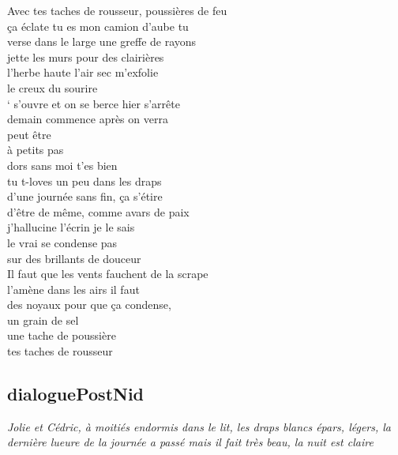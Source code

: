 \documentclass{article}
\begin{document}
Avec tes taches de rousseur, poussières de feu\\
ça éclate tu es mon camion d’aube tu\\
verse dans le large une greffe de rayons\\
jette les murs pour des clairières\\
l’herbe haute l’air sec m’exfolie\\
le creux du sourire\\
‘ s’ouvre et on se berce hier s’arrête\\
demain commence après on verra\\
peut être\\
à petits pas\\
dors sans moi t’es bien\\
tu t-loves un peu dans les draps\\
d’une journée sans fin, ça s’étire \\
d’être de même, comme avars de paix \\
j’hallucine l’écrin je le sais\\
le vrai se condense pas\\
sur des brillants de douceur\\
Il faut que les vents fauchent de la scrape\\
l’amène dans les airs il faut\\
des noyaux pour que ça condense,\\
un grain de sel\\
une tache de poussière\\
tes taches de rousseur\\
\clearpage


\subsection{dialoguePostNid}
 \textit{Jolie et Cédric, à moitiés endormis dans le lit, les
draps blancs épars, légers, la dernière lueure de la journée a passé
mais il fait très beau, la nuit est claire}
\end{document}
